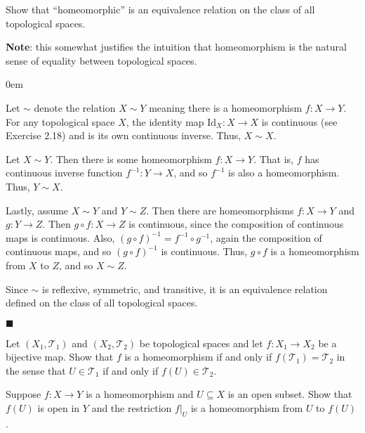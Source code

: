 \documentclass[12pt]{article}
\renewcommand{\qed}{\hfill$\blacksquare$}
\renewenvironment{proof}{\begin{addmargin}[1em]{0em}\begin{newproof}}{\end{newproof}\end{addmargin}\qed}
\newenvironment{exercise}[2][Exercise]{\begin{trivlist}
\item[\hskip \labelsep {\bfseries #1}\hskip \labelsep {\bfseries #2.}]}{\end{trivlist}}
\begin{document}
\begin{exercise}{2.20}
Show that ``homeomorphic'' is an equivalence relation on the class of all topological spaces.
\end{exercise}
\textbf{Note}: this somewhat justifies the intuition that homeomorphism is the natural sense of equality between topological spaces. \\
\begin{proof}
Let $\sim$ denote the relation $X \sim Y$ meaning there is a homeomorphism $f: X\rightarrow Y$. For any topological space $X$, the identity map $\text{Id}_X:X\rightarrow X$ is continuous (see Exercise 2.18) and is its own continuous inverse. Thus, $X \sim X$.

Let $X\sim Y$. Then there is some homeomorphism $f:X\rightarrow Y$. That is, $f$ has continuous inverse function $f^{-1}:Y\rightarrow X$, and so $f^{-1}$ is also a homeomorphism. Thus, $Y\sim X$.

Lastly, assume $X\sim Y$ and $Y \sim Z$. Then there are homeomorphisms $f:X\rightarrow Y$ and $g:Y\rightarrow Z$. Then $g\circ f : X\rightarrow Z$ is continuous, since the composition of continuous maps is continuous. Also, $\left(g\circ f\right)^{-1} = f^{-1} \circ g^{-1}$, again the composition of continuous maps, and so $\left(g\circ f\right)^{-1}$ is continuous. Thus, $g\circ f$ is a homeomorphism from $X$ to $Z$, and so $X\sim Z$.

Since $\sim$ is reflexive, symmetric, and transitive, it is an equivalence relation defined on the class of all topological spaces.
\end{proof}









\begin{exercise}{2.21}
Let $\left(X_1,\mathcal{T}_1\right)$ and $\left(X_2,\mathcal{T}_2\right)$ be topological spaces and let $f: X_1 \rightarrow X_2$ be a bijective map. Show that $f$ is a homeomorphism if and only if $f\left(\mathcal{T}_1\right) = \mathcal{T}_2$ in the sense that $U\in \mathcal{T}_1$ if and only if $f\left(U\right) \in \mathcal{T}_2$.
\end{exercise}


\begin{exercise}{2.22}
Suppose $f:X\rightarrow Y$ is a homeomorphism and $U\subseteq X$ is an open subset. Show that $f\left(U\right)$ is open in $Y$ and the restriction $f|_U$ is a homeomorphism from $U$ to $f\left(U\right)$.
\end{exercise}
\end{document}
